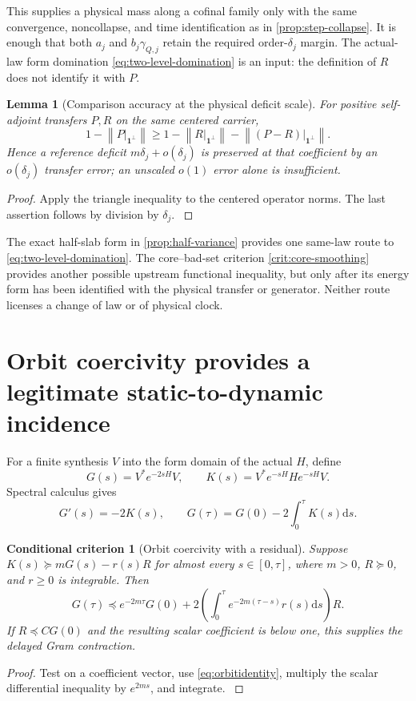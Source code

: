 \documentclass[11pt,oneside,openany]{book}
\newtheorem{lemma}[lemma]{Lemma}
\newtheorem{criterion}[criterion]{Conditional criterion}
\theoremstyle{definition}
\theoremstyle{remark}
\newcommand{\one}{\mathbf1}
\newcommand{\dd}{\mathrm d}
\newcommand{\norm}[1]{\left\lVert#1\right\rVert}
\newcommand{\src}[2]{\cite[#2]{#1}}
\begin{document}
This supplies a physical mass along a cofinal family only with the
same convergence, noncollapse, and time identification as in
\cref{prop:step-collapse}. It is enough that both $a_j$ and
$b_j\gamma_{Q,j}$ retain the required order-$\delta_j$ margin.
The actual-law form domination \cref{eq:two-level-domination} is an
input: the definition of $R$ does not identify it with $P$.

\begin{lemma}[Comparison accuracy at the physical deficit scale]
\label{lem:transfer-comparison-debit}
For positive self-adjoint transfers $P,R$ on the same centered carrier,
\begin{equation}\label{eq:transfer-comparison-debit}
1-\norm{P|_{\one^\perp}}
\ge1-\norm{R|_{\one^\perp}}
  -\norm{(P-R)|_{\one^\perp}}.
\end{equation}
Hence a reference deficit $m\delta_j+o(\delta_j)$ is preserved at that
coefficient by an $o(\delta_j)$ transfer error; an unscaled $o(1)$
error alone is insufficient.
\end{lemma}
\begin{proof}
Apply the triangle inequality to the centered operator norms. The
last assertion follows by division by $\delta_j$.
\src{F6}{V56}
\end{proof}

The exact half-slab form in \cref{prop:half-variance} provides one
same-law route to \cref{eq:two-level-domination}. The core--bad-set
criterion \cref{crit:core-smoothing} provides another possible upstream
functional inequality, but only after its energy form has been
identified with the physical transfer or generator. Neither route
licenses a change of law or of physical clock.

\section{Orbit coercivity provides a legitimate static-to-dynamic incidence}
For a finite synthesis $V$ into the form domain of the actual $H$, define
\[
G(s)=V^*e^{-2sH}V,\qquad
K(s)=V^*e^{-sH}He^{-sH}V.
\]
Spectral calculus gives
\begin{equation}\label{eq:orbitidentity}
G'(s)=-2K(s),\qquad
G(\tau)=G(0)-2\int_0^\tau K(s)\dd s.
\end{equation}

\begin{criterion}[Orbit coercivity with a residual]\label{thm:orbit}
Suppose $K(s)\succeq mG(s)-r(s)R$ for almost every $s\in[0,\tau]$, where $m>0$, $R\succeq0$, and $r\ge0$ is integrable. Then
\begin{equation}\label{eq:orbitbound}
G(\tau)\preceq e^{-2m\tau}G(0)
+2\left(\int_0^\tau e^{-2m(\tau-s)}r(s)\dd s\right)R.
\end{equation}
If $R\preceq CG(0)$ and the resulting scalar coefficient is below one, this supplies the delayed Gram contraction.
\end{criterion}
\begin{proof}
Test on a coefficient vector, use \cref{eq:orbitidentity}, multiply the scalar differential inequality by $e^{2ms}$, and integrate. \src{F1}{V2}
\end{proof}
\end{document}
